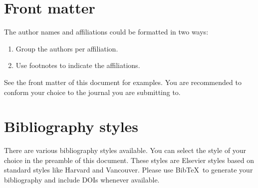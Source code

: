 \documentclass[review]{elsarticle}
\begin{document}
\section{Front matter}	

The author names and affiliations could be formatted in two ways:
\begin{enumerate}[(1)]
\item Group the authors per affiliation.
\item Use footnotes to indicate the affiliations.
\end{enumerate}
See the front matter of this document for examples. You are recommended to conform your choice to the journal you are submitting to.

\section{Bibliography styles}

There are various bibliography styles available. You can select the style of your choice in the preamble of this document. These styles are Elsevier styles based on standard styles like Harvard and Vancouver. Please use Bib\TeX\ to generate your bibliography and include DOIs whenever available.





\end{document}
